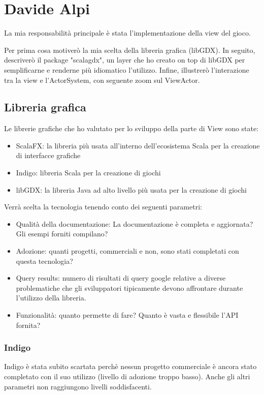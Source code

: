 \section{Davide Alpi}
La mia responsabilità principale è stata l'implementazione della view del gioco.

Per prima cosa motiverò la mia scelta della libreria grafica (libGDX).
In seguito, descriverò il package "scalagdx", un layer che ho creato on top di libGDX per semplificarne e renderne più idiomatico l'utilizzo.
Infine, illustrerò l'interazione tra la view e l'ActorSystem, con seguente zoom sul ViewActor.


\subsection{Libreria grafica}
\label{sec:view}

Le librerie grafiche che ho valutato per lo sviluppo della parte di View sono state:
\begin{itemize}
    \item ScalaFX: la libreria più usata all'interno dell'ecosistema Scala per la creazione di interfacce grafiche
    \item Indigo: libreria Scala per la creazione di giochi
    \item libGDX: la libreria Java ad alto livello più usata per la creazione di giochi
\end{itemize}
Verrà scelta la tecnologia tenendo conto dei seguenti parametri:
\begin{itemize}
    \item Qualità della documentazione: La documentazione è completa e aggiornata? Gli esempi forniti compilano?
    \item Adozione: quanti progetti, commerciali e non, sono stati completati con questa tecnologia?
    \item Query results: numero di risultati di query google relative a diverse problematiche che gli sviluppatori tipicamente devono affrontare durante l'utilizzo della libreria.
    \item Funzionalità: quanto permette di fare? Quanto è vasta e flessibile l'API fornita?
\end{itemize}

\subsubsection{Indigo}
Indigo è stata subito scartata perchè nessun progetto commerciale è ancora stato completato con il suo utilizzo (livello di adozione troppo basso). Anche gli altri parametri non raggiungono livelli soddisfacenti.

